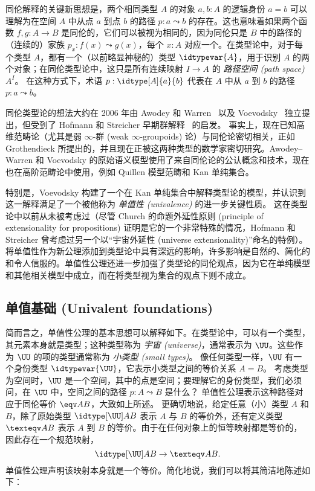 同伦解释的关键新思想是，两个相同类型 $A$ 的对象 $a, b: A$ 的逻辑身份 $a = b$ 可以理解为在空间 $A$ 中从点 $a$ 到点 $b$ 的路径 $p : a \leadsto b$ 的存在。这也意味着如果两个函数 $f, g: A\to B$ 是同伦的，它们可以被视为相同的，因为同伦只是 $B$ 中的路径的（连续的）家族 $p_x: f(x) \leadsto g(x)$，每个 $x:A$ 对应一个。在类型论中，对于每个类型 $A$，都有一个（以前略显神秘的）类型 $\idtypevar{A}$，用于识别 $A$ 的两个对象；在同伦类型论中，这只是所有连续映射 $I\to A$ 的 \emph{路径空间 (path space)} $A^I$。
在这种方式下，术语 $p : \idtype[A]{a}{b}$ 代表在 $A$ 中从 $a$ 到 $b$ 的路径 $p : a \leadsto b$。

同伦类型论的想法大约在 2006 年由 Awodey 和 Warren~\cite{AW} 以及 Voevodsky~\cite{VV} 独立提出，但受到了 Hofmann 和 Streicher 早期群解释~\cite{hs:gpd-typethy} 的启发。
事实上，现在已知高维范畴论（尤其是弱 $\infty$-群 (weak $\infty$-groupoids) 论）与同伦论密切相关，正如 Grothendieck 所提出的，并且现在正被这两种类型的数学家密切研究。Awodey--Warren 和 Voevodsky 的原始语义模型使用了来自同伦论的公认概念和技术，现在也在高阶范畴论中使用，例如 Quillen 模型范畴和 Kan 单纯集合。
%

特别是，Voevodsky 构建了一个在 Kan 单纯集合中解释类型论的模型，并认识到这一解释满足了一个被他称为 \emph{单值性 (univalence)} 的进一步关键性质。
这在类型论中以前从未被考虑过（尽管 Church 的命题外延性原则 (principle of extensionality for propositions) 证明是它的一个非常特殊的情况，Hofmann 和 Streicher 曾考虑过另一个以“宇宙外延性 (universe extensionality)”命名的特例）。
将单值性作为新公理添加到类型论中具有深远的影响，许多影响是自然的、简化的和令人信服的。单值性公理还进一步加强了类型论的同伦观点，因为它在单纯模型和其他相关模型中成立，而在将类型视为集合的观点下则不成立。

\subsection*{单值基础 (Univalent foundations)}

简而言之，单值性公理的基本思想可以解释如下。在类型论中，可以有一个类型，其元素本身就是类型；这种类型称为 \emph{宇宙 (universe)}，通常表示为 $\UU$。这些作为 $\UU$ 的项的类型通常称为 \emph{小类型 (small types)}。
像任何类型一样，$\UU$ 有一个身份类型 $\idtypevar{\UU}$，它表示小类型之间的等价关系 $A = B$。
考虑类型为空间时，$\UU$ 是一个空间，其中的点是空间；要理解它的身份类型，我们必须问，在 $\UU$ 中，空间之间的路径 $p : A \leadsto B$ 是什么？
单值性公理表示这种路径对应于同伦等价 $\eqv A B$，大致如上所述。
更确切地说，给定任意（小）类型 $A$ 和 $B$，除了原始类型 $\idtype[\UU]AB$ 表示 $A$ 与 $B$ 的等价外，还有定义类型 $\texteqv AB$ 表示 $A$ 到 $B$ 的等价。由于在任何对象上的恒等映射都是等价的，因此存在一个规范映射，
\[\idtype[\UU]AB\to\texteqv AB.\]
单值性公理声明该映射本身就是一个等价。简化地说，我们可以将其简洁地陈述如下：

